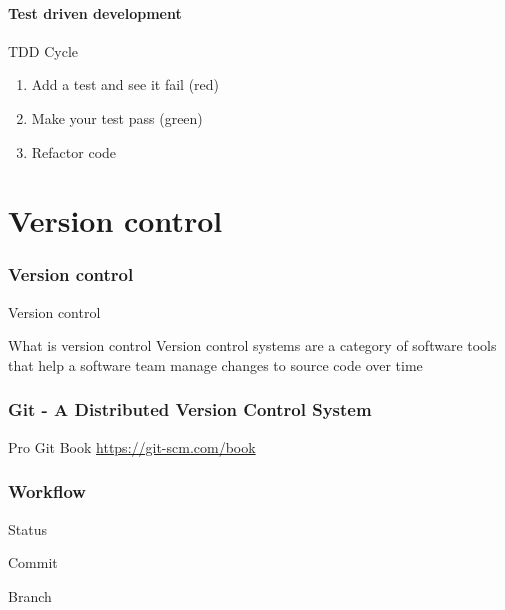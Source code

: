 \documentclass{beamer}
\begin{document}
\subsection{Test driven development}

\begin{frame}{TDD Cycle}
\begin{enumerate}
  \item Add a test and see it fail (red)
  \item Make your test pass (green)
  \item Refactor code
\end{enumerate}
\end{frame}

\part{Version control}
\section{Version control}

\begin{frame}{Version control}
\begin{block}{What is version control}
Version control systems are a category of software tools that help a software
team manage changes to source code over time
\cite{AtlassianGitTutorials}
\end{block}
\end{frame}

\section{Git - A Distributed Version Control System}
\begin{frame}{Pro Git Book}
\url{https://git-scm.com/book}
\end{frame}

\section{Workflow}
\begin{frame}{Status}
\end{frame}

\begin{frame}{Commit}
\end{frame}

\begin{frame}{Branch}
\end{frame}
\end{document}
